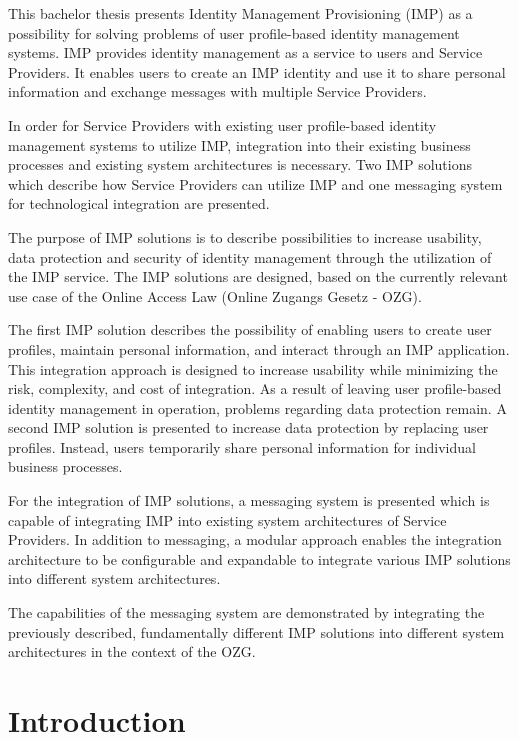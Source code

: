 \documentclass[
     12pt,         %
     a4paper,      %
     BCOR=10mm,version=first,     %
     DIV=14,version=first,        %
     ]{scrreprt}
\begin{document}
This bachelor thesis presents Identity Management Provisioning (IMP) as a possibility for solving problems of user profile-based identity management systems. IMP provides identity management as a service to users and Service Providers. It enables users to create an IMP identity and use it to share personal information and exchange messages with multiple Service Providers.

In order for Service Providers with existing user profile-based identity management systems to utilize IMP, integration into their existing business processes and existing system architectures is necessary. Two IMP solutions which describe how Service Providers can utilize IMP and one messaging system for technological integration are presented.

The purpose of IMP solutions is to describe possibilities to increase usability, data protection and security of identity management through the utilization of the IMP service. The IMP solutions are designed, based on the currently relevant use case of the Online Access Law (Online Zugangs Gesetz - OZG).

The first IMP solution describes the possibility of enabling users to create user profiles, maintain personal information, and interact through an IMP application. This integration approach is designed to increase usability while minimizing the risk, complexity, and cost of integration.
As a result of leaving user profile-based identity management in operation, problems regarding data protection remain. A second IMP solution is presented to increase data protection by replacing user profiles. Instead, users temporarily share personal information for individual business processes.   

For the integration of IMP solutions, a messaging system is presented which is capable of integrating IMP into existing system architectures of Service Providers. In addition to messaging, a modular approach enables the integration architecture to be configurable and expandable to integrate various IMP solutions into different system architectures.

The capabilities of the messaging system are demonstrated by integrating the previously described, fundamentally different IMP solutions into different system architectures in the context of the OZG.

\newpage

\tableofcontents
\cleardoublepage
{}

\chapter{Introduction}

\end{document}
